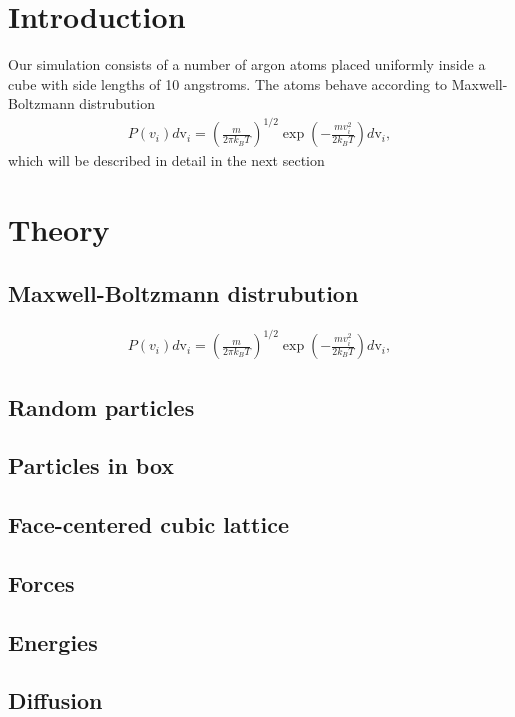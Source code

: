 \documentclass[10pt]{article}
\begin{document}
\begin{multicols}{2}
\tableofcontents

{}
\section{Introduction}
Our simulation consists of a number of argon atoms placed uniformly inside a cube with side lengths of 10 angstroms. The atoms behave according to Maxwell-Boltzmann distrubution
\begin{align} 
P(v_i)d\mathrm{v}_i = \left(\frac{m}{2\pi k_B
T}\right)^{1/2} \exp\left(-\frac{m v_i^2}{2k_B T}\right)d\mathrm{v}_i,
\end{align} 
which will be described in detail in the next section


\section{Theory}
\subsection{Maxwell-Boltzmann distrubution}
\begin{align} 
P(v_i)d\mathrm{v}_i = \left(\frac{m}{2\pi k_B
T}\right)^{1/2} \exp\left(-\frac{m v_i^2}{2k_B T}\right)d\mathrm{v}_i,
\end{align} 

\subsection{Random particles}
\subsection{Particles in box}
\subsection{Face-centered cubic lattice}
\subsection{Forces}
\subsection{Energies}
\subsection{Diffusion}



\end{multicols}
\end{document}
